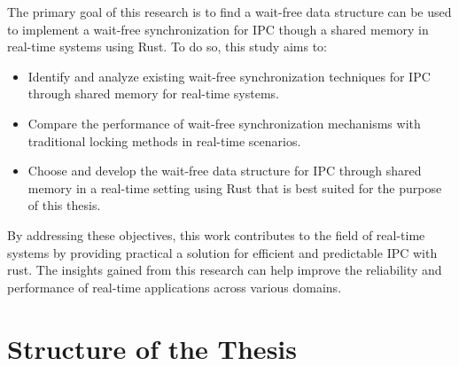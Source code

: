 The primary goal of this research is to find a wait-free data structure can be used to implement a wait-free synchronization for \ac{IPC} though a shared memory in real-time systems using Rust. To do so, this study aims to:

\begin{itemize}
\item Identify and analyze existing wait-free synchronization techniques for \ac{IPC} through shared memory for real-time systems.
\item Compare the performance of wait-free synchronization mechanisms with traditional locking methods in real-time scenarios.
\item Choose and develop the wait-free data structure for \ac{IPC} through shared memory in a real-time setting using Rust that is best suited for the purpose of this thesis.
\end{itemize}

By addressing these objectives, this work contributes to the field of real-time systems by providing practical a solution for efficient and predictable \ac{IPC} with rust. The insights gained from this research can help improve the reliability and performance of real-time applications across various domains.

\section{Structure of the Thesis}\label{sec:structure-of-the-thesis}



